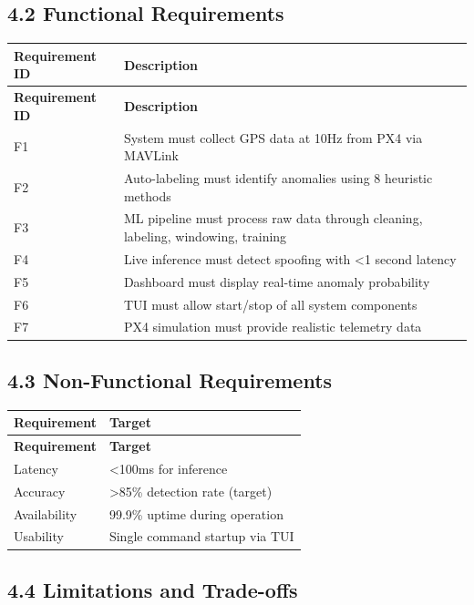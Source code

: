 \documentclass[12pt,a4paper]{article}
\begin{document}
\subsection{4.2 Functional Requirements}

\begin{longtable}{|p{3cm}|p{12cm}|}
\hline
\textbf{Requirement ID} & \textbf{Description} \\
\hline
\endfirsthead
\hline
\textbf{Requirement ID} & \textbf{Description} \\
\hline
\endhead
\hline
F1 & System must collect GPS data at 10Hz from PX4 via MAVLink \\
\hline
F2 & Auto-labeling must identify anomalies using 8 heuristic methods \\
\hline
F3 & ML pipeline must process raw data through cleaning, labeling, windowing, training \\
\hline
F4 & Live inference must detect spoofing with <1 second latency \\
\hline
F5 & Dashboard must display real-time anomaly probability \\
\hline
F6 & TUI must allow start/stop of all system components \\
\hline
F7 & PX4 simulation must provide realistic telemetry data \\
\hline
\end{longtable}

\subsection{4.3 Non-Functional Requirements}

\begin{longtable}{|p{3cm}|p{12cm}|}
\hline
\textbf{Requirement} & \textbf{Target} \\
\hline
\endfirsthead
\hline
\textbf{Requirement} & \textbf{Target} \\
\hline
\endhead
\hline
Latency & <100ms for inference \\
\hline
Accuracy & >85\% detection rate (target) \\
\hline
Availability & 99.9\% uptime during operation \\
\hline
Usability & Single command startup via TUI \\
\hline
\end{longtable}

\subsection{4.4 Limitations and Trade-offs}
\end{document}
